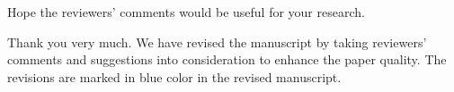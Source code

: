 \begin{Editor}
  \begin{CommentSummary}
    Hope the reviewers' comments would be useful for your research.
  \end{CommentSummary}
  
  \begin{Response}
    Thank you very much.
    We have revised the manuscript by taking reviewers’ comments and suggestions into consideration to enhance the paper quality.
    The revisions are marked in {\color{blue}blue} color in the revised manuscript.
  \end{Response}
\end{Editor}